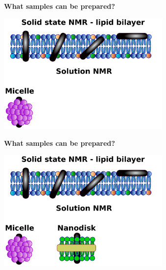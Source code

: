 \documentclass{beamer}
\begin{document}
\addtocounter{framenumber}{-1}
\begin{frame}
\begin{center}
\Large{\centering
\textbf{What samples can be prepared?} \\}

\vspace{0.5cm}

\includegraphics[height=6cm]{plots/samples3.pdf}
\end{center}
\end{frame}

\addtocounter{framenumber}{-1}
\begin{frame}
\begin{center}
\Large{\centering
\textbf{What samples can be prepared?} \\}

\vspace{0.5cm}

\includegraphics[height=6cm]{plots/samples2.pdf}
\end{center}
\end{frame}
\end{document}
